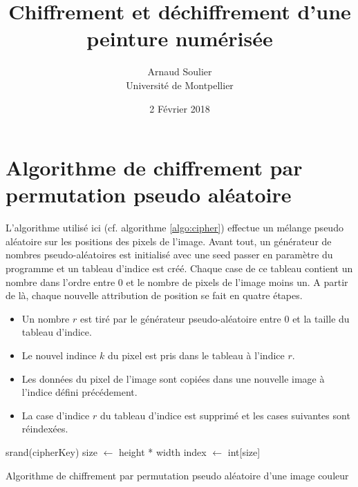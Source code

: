 \documentclass[a4paper]{article}
\title{Chiffrement et déchiffrement d'une peinture numérisée}
\author{Arnaud Soulier\\Université de Montpellier}
\date{2 Février 2018}
\begin{document}
    \maketitle

    \newpage

    \section{Algorithme de chiffrement par permutation pseudo aléatoire}

        L'algorithme utilisé ici (cf. algorithme \ref{algo:cipher}) effectue un mélange pseudo aléatoire sur les positions des pixels de l'image. Avant tout, un générateur de nombres pseudo-aléatoires est initialisé avec une seed passer en paramètre du programme et un tableau d'indice est créé. Chaque case de ce tableau contient un nombre dans l'ordre entre 0 et le nombre de pixels de l'image moins un. A partir de là, chaque nouvelle attribution de position se fait en quatre étapes.
        \begin{itemize}
            \item Un nombre $r$ est tiré par le générateur pseudo-aléatoire entre 0 et la taille du tableau d'indice.
            \item Le nouvel indince $k$ du pixel est pris dans le tableau à l'indice $r$.
            \item Les données du pixel de l'image sont copiées dans une nouvelle image à l'indice défini précédement.
            \item La case d'indice $r$ du tableau d'indice est supprimé et les cases suivantes sont réindexées.
        \end{itemize}

        \begin{algorithm}[htbp]
            \SetAlgoLined
            srand(cipherKey)\;
            size $\leftarrow$ height * width\;
            index $\leftarrow$ int[size]\;
            \caption{Algorithme de chiffrement par permutation pseudo aléatoire d'une image couleur}
            \label{algo:cipher}
        \end{algorithm}
\end{document}
